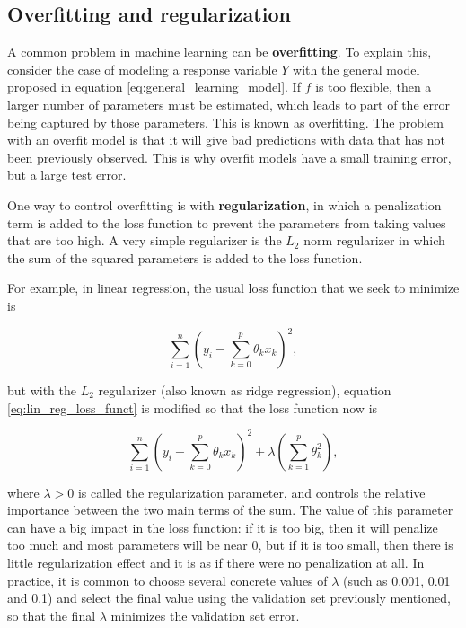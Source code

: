 \subsection{Overfitting and regularization}

A common problem in machine learning can be \textbf{overfitting}. To explain this, consider the case of modeling a response variable $Y$ with the general model proposed in equation \ref{eq:general_learning_model}. If $f$ is too flexible, then a larger number of parameters must be estimated, which leads to part of the error being captured by those parameters. This is known as overfitting. The problem with an overfit model is that it will give bad predictions with data that has not been previously observed. This is why overfit models have a small training error, but a large test error.

One way to control overfitting is with \textbf{regularization}, in which a penalization term is added to the loss function to prevent the parameters from taking values that are too high. A very simple regularizer is the $L_2$ norm regularizer in which the sum of the squared parameters is added to the loss function.

For example, in linear regression, the usual loss function that we seek to minimize is

\begin{equation}
  \label{eq:lin_reg_loss_funct}
  \sum_{i = 1}^n{ \left( y_i - \sum_{k = 0}^p  \theta_k x_k \right) ^ 2},
\end{equation}

but with the $L_2$ regularizer (also known as ridge regression), equation \ref{eq:lin_reg_loss_funct} is modified so that the loss function now is

\begin{equation}
  \label{eq:lin_reg_loss_funct_reg}
  \sum_{i = 1}^n{ \left( y_i - \sum_{k = 0}^p \theta_k x_k \right) ^ 2}
  + \lambda \left( \sum_{k = 1}^p \theta_k^2 \right),
\end{equation}

where $\lambda > 0$ is called the regularization parameter, and controls the relative importance between the two main terms of the sum. The value of this parameter can have a big impact in the loss function: if it is too big, then it will penalize too much and most parameters will be near 0, but if it is too small, then there is little regularization effect and it is as if there were no penalization at all. In practice, it is common to choose several concrete values of $\lambda$ (such as 0.001, 0.01 and 0.1) and select the final value using the validation set previously mentioned, so that the final $\lambda$ minimizes the validation set error.

